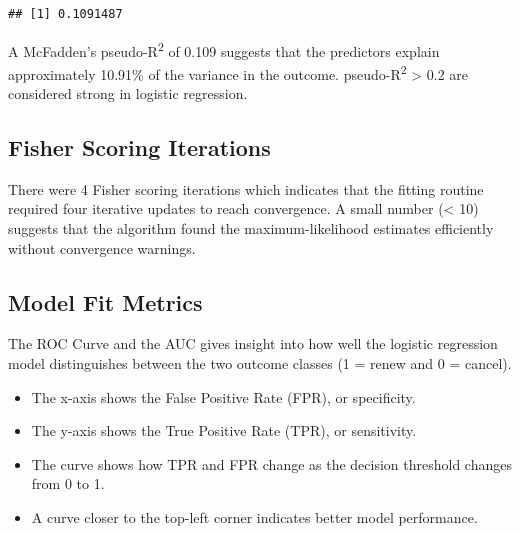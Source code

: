 \documentclass[
]{article}
\newenvironment{Shaded}{\begin{snugshade}}{\end{snugshade}}
\newcommand{\AttributeTok}[1]{\textcolor[rgb]{0.13,0.29,0.53}{#1}}
\newcommand{\FunctionTok}[1]{\textcolor[rgb]{0.13,0.29,0.53}{\textbf{#1}}}
\newcommand{\NormalTok}[1]{#1}
\newcommand{\OtherTok}[1]{\textcolor[rgb]{0.56,0.35,0.01}{#1}}
\newcommand{\SpecialCharTok}[1]{\textcolor[rgb]{0.81,0.36,0.00}{\textbf{#1}}}
\newcommand{\StringTok}[1]{\textcolor[rgb]{0.31,0.60,0.02}{#1}}
\begin{document}
\begin{verbatim}
## [1] 0.1091487
\end{verbatim}

A McFadden's pseudo-R\textsuperscript{2} of 0.109 suggests that the
predictors explain approximately 10.91\% of the variance in the outcome.
pseudo-R\textsuperscript{2} \textgreater{} 0.2 are considered strong in
logistic regression.

\subsection{Fisher Scoring Iterations}\label{fisher-scoring-iterations}

There were 4 Fisher scoring iterations which indicates that the fitting
routine required four iterative updates to reach convergence. A small
number (\textless{} 10) suggests that the algorithm found the
maximum-likelihood estimates efficiently without convergence warnings.

\subsection{Model Fit Metrics}\label{model-fit-metrics}

The ROC Curve and the AUC gives insight into how well the logistic
regression model distinguishes between the two outcome classes (1 =
renew and 0 = cancel).

\begin{itemize}
\item
  The x-axis shows the False Positive Rate (FPR), or specificity.
\item
  The y-axis shows the True Positive Rate (TPR), or sensitivity.
\item
  The curve shows how TPR and FPR change as the decision threshold
  changes from 0 to 1.
\item
  A curve closer to the top-left corner indicates better model
  performance.
\end{itemize}

\begin{Shaded}
\end{Shaded}
\end{document}
